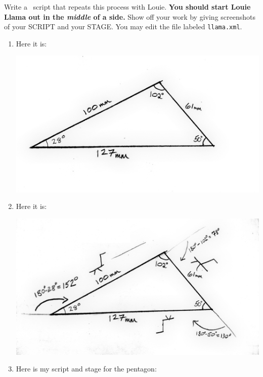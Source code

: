 \documentclass[nooutcomes,noauthor,handout]{../ximera}
\begin{document}
\mynewpage


\begin{question}
   Write a \snap\ script that repeats this process with Louie. \textbf{You should start Louie Llama out in the
    \emph{middle} of a side.}  Show off your work by giving screenshots of
    your SCRIPT and your STAGE. You may edit the file labeled \texttt{llama.xml}. 
  \begin{freeResponse}
    \begin{enumerate}
    \item Here it is:
      \begin{center}
        \includegraphics[width=.4\textwidth]{specificTri.jpg}
      \end{center}
    \item Here it is:
      \begin{center}
        \includegraphics[width=.4\textwidth]{llamaAndSpecificTri.jpg}
      \end{center}
    \item Here is my script and stage for the pentagon:
      \begin{center}
        \qquad
      \end{center}
      
    \end{enumerate}
  \end{freeResponse}
\end{question}
\end{document}

